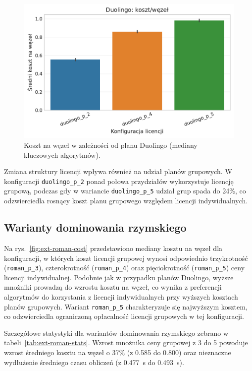 \begin{figure}[H]
    \centering
    \includegraphics[width=0.6\linewidth]{assets/figures/extensions/static/duolingo_cost_per_node_comparison.pdf}
    \caption{Koszt na węzeł w zależności od planu Duolingo (mediany kluczowych algorytmów).}
    \label{fig:ext-duolingo-cost}
\end{figure}

Zmiana struktury licencji wpływa również na udział planów grupowych. W konfiguracji \texttt{duolingo\_p\_2} ponad połowa przydziałów wykorzystuje licencję grupową, podczas gdy w wariancie \texttt{duolingo\_p\_5} udział grup spada do 24\%, co odzwierciedla rosnący koszt planu grupowego względem licencji indywidualnych.

\subsection{Warianty dominowania rzymskiego}
Na rys.~\ref{fig:ext-roman-cost} przedstawiono mediany kosztu na węzeł dla konfiguracji, w których koszt licencji grupowej wynosi odpowiednio trzykrotność (\texttt{roman\_p\_3}), czterokrotność (\texttt{roman\_p\_4}) oraz pięciokrotność (\texttt{roman\_p\_5}) ceny licencji indywidualnej. Podobnie jak w przypadku planów Duolingo, wyższe mnożniki prowadzą do wzrostu kosztu na węzeł, co wynika z preferencji algorytmów do korzystania z licencji indywidualnych przy wyższych kosztach planów grupowych. Wariant \texttt{roman\_p\_5} charakteryzuje się najwyższym kosztem, co odzwierciedla ograniczoną opłacalność licencji grupowych w tej konfiguracji.

Szczegółowe statystyki dla wariantów dominowania rzymskiego zebrano w tabeli~\ref{tab:ext-roman-stats}. Wzrost mnożnika ceny grupowej z 3 do 5 powoduje wzrost średniego kosztu na węzeł o 37\% (z 0.585 do 0.800) oraz nieznaczne wydłużenie średniego czasu obliczeń (z \SI{0.477}{\second} do \SI{0.493}{\second}).


